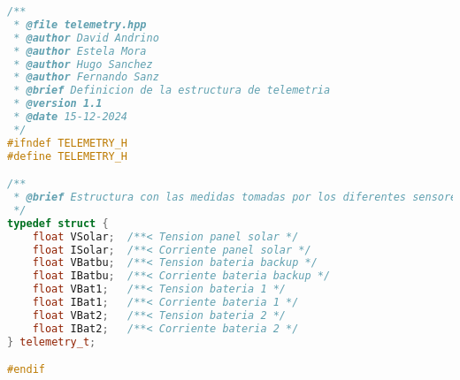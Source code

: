 \begin{lstlisting}[language=c++,caption={Fichero\texttt{telemetry.hpp}}, captionpos=b]
/**
 * @file telemetry.hpp
 * @author David Andrino
 * @author Estela Mora
 * @author Hugo Sanchez
 * @author Fernando Sanz
 * @brief Definicion de la estructura de telemetria
 * @version 1.1
 * @date 15-12-2024
 */
#ifndef TELEMETRY_H
#define TELEMETRY_H

/**
 * @brief Estructura con las medidas tomadas por los diferentes sensores
 */
typedef struct {
    float VSolar;  /**< Tension panel solar */
    float ISolar;  /**< Corriente panel solar */
    float VBatbu;  /**< Tension bateria backup */
    float IBatbu;  /**< Corriente bateria backup */
    float VBat1;   /**< Tension bateria 1 */
    float IBat1;   /**< Corriente bateria 1 */
    float VBat2;   /**< Tension bateria 2 */
    float IBat2;   /**< Corriente bateria 2 */
} telemetry_t;

#endif
\end{lstlisting}

